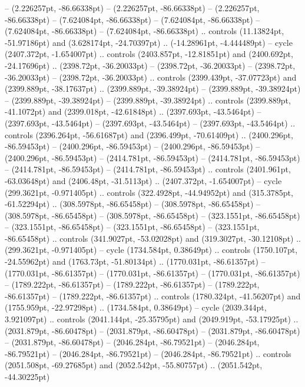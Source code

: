  -- (2.226257pt, -86.66338pt)
 -- (2.226257pt, -86.66338pt)
 -- (2.226257pt, -86.66338pt)
 -- (7.624084pt, -86.66338pt)
 -- (7.624084pt, -86.66338pt)
 -- (7.624084pt, -86.66338pt)
 -- (7.624084pt, -86.66338pt) .. controls (11.13824pt, -51.97186pt) and (3.628174pt, -24.70397pt) .. (-14.28961pt, -4.444489pt) -- cycle
(2407.372pt, -1.654007pt) .. controls (2403.857pt, -12.81851pt) and (2400.692pt, -24.17696pt) .. (2398.72pt, -36.20033pt)
 -- (2398.72pt, -36.20033pt)
 -- (2398.72pt, -36.20033pt)
 -- (2398.72pt, -36.20033pt) .. controls (2399.439pt, -37.07723pt) and (2399.889pt, -38.17637pt) .. (2399.889pt, -39.38924pt)
 -- (2399.889pt, -39.38924pt)
 -- (2399.889pt, -39.38924pt)
 -- (2399.889pt, -39.38924pt) .. controls (2399.889pt, -41.1072pt) and (2399.018pt, -42.61848pt) .. (2397.693pt, -43.5464pt)
 -- (2397.693pt, -43.5464pt)
 -- (2397.693pt, -43.5464pt)
 -- (2397.693pt, -43.5464pt) .. controls (2396.264pt, -56.61687pt) and (2396.499pt, -70.61409pt) .. (2400.296pt, -86.59453pt)
 -- (2400.296pt, -86.59453pt)
 -- (2400.296pt, -86.59453pt)
 -- (2400.296pt, -86.59453pt)
 -- (2414.781pt, -86.59453pt)
 -- (2414.781pt, -86.59453pt)
 -- (2414.781pt, -86.59453pt)
 -- (2414.781pt, -86.59453pt) .. controls (2401.961pt, -63.03648pt) and (2406.48pt, -31.5113pt) .. (2407.372pt, -1.654007pt) -- cycle
(299.3621pt, -0.971405pt) .. controls (322.4928pt, -44.94952pt) and (315.3785pt, -61.52294pt) .. (308.5978pt, -86.65458pt)
 -- (308.5978pt, -86.65458pt)
 -- (308.5978pt, -86.65458pt)
 -- (308.5978pt, -86.65458pt)
 -- (323.1551pt, -86.65458pt)
 -- (323.1551pt, -86.65458pt)
 -- (323.1551pt, -86.65458pt)
 -- (323.1551pt, -86.65458pt) .. controls (341.9027pt, -53.02028pt) and (319.3027pt, -30.12108pt) .. (299.3621pt, -0.971405pt) -- cycle
(1734.584pt, 0.38649pt) .. controls (1750.107pt, -24.55962pt) and (1763.73pt, -51.80134pt) .. (1770.031pt, -86.61357pt)
 -- (1770.031pt, -86.61357pt)
 -- (1770.031pt, -86.61357pt)
 -- (1770.031pt, -86.61357pt)
 -- (1789.222pt, -86.61357pt)
 -- (1789.222pt, -86.61357pt)
 -- (1789.222pt, -86.61357pt)
 -- (1789.222pt, -86.61357pt) .. controls (1780.324pt, -41.56207pt) and (1755.959pt, -22.97298pt) .. (1734.584pt, 0.38649pt) -- cycle
(2039.344pt, 3.921097pt) .. controls (2041.144pt, -25.35795pt) and (2049.919pt, -53.17925pt) .. (2031.879pt, -86.60478pt)
 -- (2031.879pt, -86.60478pt)
 -- (2031.879pt, -86.60478pt)
 -- (2031.879pt, -86.60478pt)
 -- (2046.284pt, -86.79521pt)
 -- (2046.284pt, -86.79521pt)
 -- (2046.284pt, -86.79521pt)
 -- (2046.284pt, -86.79521pt) .. controls (2051.508pt, -69.27685pt) and (2052.542pt, -55.80757pt) .. (2051.542pt, -44.30225pt)
